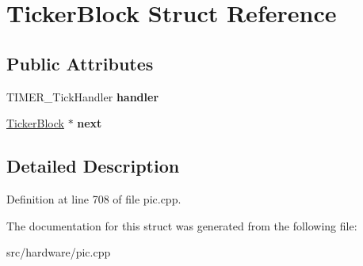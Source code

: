 \hypertarget{structTickerBlock}{\section{Ticker\-Block Struct Reference}
\label{structTickerBlock}
}
\subsection*{Public Attributes}
\begin{DoxyCompactItemize}
\item 
\hypertarget{structTickerBlock_a988263e8ab525b52670e556aece5f427}{T\-I\-M\-E\-R\-\_\-\-Tick\-Handler {\bfseries handler}}\label{structTickerBlock_a988263e8ab525b52670e556aece5f427}

\item 
\hypertarget{structTickerBlock_a291819bf28ca00f5d7c0a26d1f771e8b}{\hyperlink{structTickerBlock}{Ticker\-Block} $\ast$ {\bfseries next}}\label{structTickerBlock_a291819bf28ca00f5d7c0a26d1f771e8b}

\end{DoxyCompactItemize}


\subsection{Detailed Description}


Definition at line 708 of file pic.\-cpp.



The documentation for this struct was generated from the following file\-:\begin{DoxyCompactItemize}
\item 
src/hardware/pic.\-cpp\end{DoxyCompactItemize}
